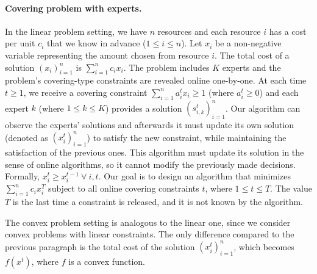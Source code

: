 \paragraph{Covering problem with experts.}
In the linear problem setting, we have $n$ resources and each resource $i$ has a cost per unit $c_{i}$ that we know in advance ($1 \leq i \leq n$).
Let $x_{i}$ be a non-negative variable representing the amount chosen from resource $i$.
The total cost of a solution $(x_{i})_{i=1}^{n}$ is $\sum_{i=1}^{n} c_{i} x_{i}$.
The problem includes $K$ experts and the problem's covering-type constraints are revealed online one-by-one.
At each time $t \geq 1$, we receive a covering constraint $\sum_{i=1}^{n} a_{i}^{t} x_{i} \geq 1$ (where $a_{i}^{t} \geq 0$) and each expert $k$ (where $1 \leq k \leq K$) provides
a solution $(s_{i,k}^{t})_{i=1}^{n}$. Our algorithm can observe the experts' solutions and afterwards it must update its own solution (denoted as $(x_{i}^{t})_{i=1}^{n}$)
to satisfy the new constraint, while maintaining the satisfaction of the previous ones. This algorithm must update its solution in the sense of online algorithms, so it cannot modify the previously made decisions. Formally, $x_{i}^{t} \geq x_{i}^{t-1} ~\forall\ i, t$.
Our goal is to design an algorithm that minimizes $\sum_{i=1}^{n} c_{i} x_{i}^{T}$ subject to
all online covering constraints $t$, where $1 \leq t \leq T$. The value $T$ is the last time a constraint is released, and it is not known by the algorithm.

The convex problem setting is analogous to the linear one, since we consider convex problems with linear constraints. The only difference compared to the previous paragraph is the total cost of the solution $(x_{i}^t)_{i=1}^{n}$, which becomes $f(x^t)$, where $f$ is a convex function.

